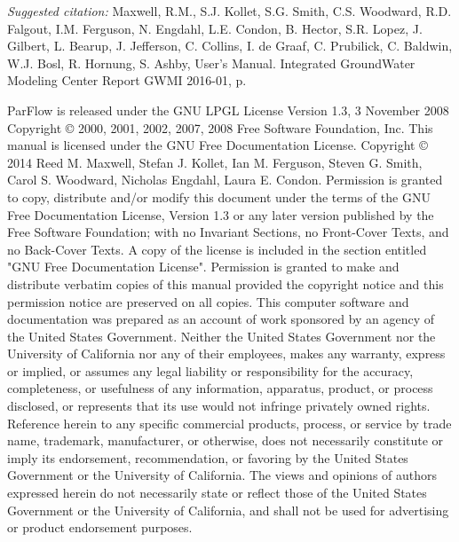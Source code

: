 \documentclass{book}
\begin{document}

\begin{CopyrightPage}
{\em Suggested citation: }Maxwell, R.M., S.J. Kollet, S.G. Smith, C.S. Woodward, R.D. Falgout, I.M. Ferguson, N. Engdahl, L.E. Condon, B. Hector, S.R. Lopez, J. Gilbert, L. Bearup, J. Jefferson, C. Collins, I. de Graaf, C. Prubilick, C. Baldwin, W.J. Bosl, R. Hornung, S. Ashby, \parflow{} User's Manual. Integrated GroundWater Modeling Center Report GWMI 2016-01, \pageref{end}p.\newline

{ \scriptsize
\noindent ParFlow is released under the GNU LPGL License \newline
\noindent Version 1.3, 3 November 2008 \newline
\noindent Copyright \copyright{} 2000, 2001, 2002, 2007, 2008  Free Software Foundation, Inc.\newline
{}\newline
This manual is licensed under the GNU Free Documentation License.\newline%
Copyright \copyright{} 2014  Reed M. Maxwell, Stefan J. Kollet, Ian M. Ferguson, Steven G. Smith, Carol S. Woodward, Nicholas Engdahl, Laura E. Condon.
Permission is granted to copy, distribute and/or modify this document
under the terms of the GNU Free Documentation License, Version 1.3
or any later version published by the Free Software Foundation; with no Invariant Sections, no Front-Cover Texts, and no Back-Cover Texts. A copy of the license is included in the section entitled "GNU Free Documentation License".
Permission is granted to make and distribute verbatim copies of this
manual provided the copyright notice and this permission notice are
preserved on all copies.\newline\vspace{0.1em}
This computer software and documentation was prepared as an account of
work sponsored by an agency of the United  States Government.  Neither
the United States Government nor the  University of California nor any
of their employees, makes any warranty, express or implied, or assumes
any legal liability  or responsibility for the accuracy, completeness,
or   usefulness of any   information,  apparatus, product, or  process
disclosed,   or represents that  its  use would not infringe privately
owned rights.  Reference  herein to any specific  commercial products,
process,   or service by   trade  name,  trademark,  manufacturer,  or
otherwise, does not  necessarily constitute or imply its  endorsement,
recommendation, or  favoring  by the  United  States Government or the
University of California.  The views and opinions of authors expressed
herein do not necessarily state or reflect those  of the United States
Government or the University of California, and shall  not be used for
advertising or product endorsement purposes.}
\end{CopyrightPage}
\end{document}
